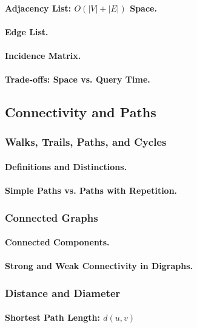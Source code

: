 \paragraph{Adjacency List: $O(|V| + |E|)$ Space.}
\paragraph{Edge List.}
\paragraph{Incidence Matrix.}
\paragraph{Trade-offs: Space vs. Query Time.}

\subsection{Connectivity and Paths}
\label{subsec:connectivity}

\subsubsection{Walks, Trails, Paths, and Cycles}
\paragraph{Definitions and Distinctions.}
\paragraph{Simple Paths vs. Paths with Repetition.}

\subsubsection{Connected Graphs}
\paragraph{Connected Components.}
\paragraph{Strong and Weak Connectivity in Digraphs.}

\subsubsection{Distance and Diameter}
\paragraph{Shortest Path Length: $d(u,v)$}

